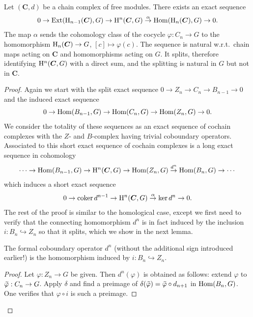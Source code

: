 \begin{prop}\label{prop 11.9.2 tomDieck}
    Let $(\bm{C},d)$ be a chain complex of free modules. There exists an exact sequence
    \[0\to \operatorname{Ext}(\mathrm{H}_{n-1}(\boldsymbol{C}),G)\to \mathrm{H}^n(\boldsymbol{C},G)\overset{\alpha}{\to}\operatorname{Hom}(\mathrm{H}_n(\boldsymbol{C}),G)\to 0.\]
    The map $\alpha$ sends the cohomology class of the cocycle $\varphi:C_n\to G$ to the homomorphism $\mathrm{H}_n(\boldsymbol{C})\to G$, $[c]\mapsto \varphi(c)$. The sequence is natural w.r.t.\ chain maps acting on $\bm{C}$ and homomorphisms acting on $G$. It splits, therefore identifying $\mathrm{H}^n(\boldsymbol{C},G)$ with a direct sum, and the splitting is natural in $G$ but not in $\bm{C}$. 
\end{prop}
\begin{proof}
    Again we start with the split exact sequence $0\to Z_n\to C_n\to B_{n-1}\to 0$ and the induced exact sequence
    \[0\to \operatorname{Hom}(B_{n-1},G)\to \operatorname{Hom}(C_n,G)\to \operatorname{Hom}(Z_n,G)\to 0.\]
    We consider the totality of these sequences as an exact sequence of cochain complexes with the $Z$- and $B$-complex having trivial coboundary operators. Associated to this short exact sequence of cochain complexes is a long exact sequence in cohomology
    \[\cdots\to \operatorname{Hom}(B_{n-1},G)\to \mathrm{H}^n(\boldsymbol{C},G)\to \operatorname{Hom}(Z_n,G)\overset{d^n}{\to}\operatorname{Hom}(B_n,G)\to \cdots\]
    which induces a short exact sequence
    \[0\to \operatorname{coker} d^{n-1}\to \mathrm{H}^n(\boldsymbol{C},G)\overset{\alpha}{\to }\ker d^n\to 0.\]
    The rest of the proof is similar to the homological case, except we first need to verify that the connecting homomorphism $d^n$ is in fact induced by the inclusion $i:B_n\hookrightarrow Z_n$ so that it splits, which we show in the next lemma.

    \begin{lem}\label{lem 11.9.3 tomDieck}
        The formal coboundary operator $d^n$ (without the additional sign introduced earlier!) is the homomorphism induced by $i:B_n\hookrightarrow Z_n$.
    \end{lem}
    \begin{proof}
        Let $\varphi:Z_n\to G$ be given. Then $d^n(\varphi)$ is obtained as follows: extend $\varphi$ to $\wt{\varphi}:C_n\to G$. Apply $\delta$ and find a preimage of $\delta(\wt{\varphi})=\wt{\varphi}\circ d_{n+1}$ in $\operatorname{Hom}(B_n,G)$. One verifies that $\varphi\circ i$ is such a preimage.
    \end{proof}


\end{proof}
